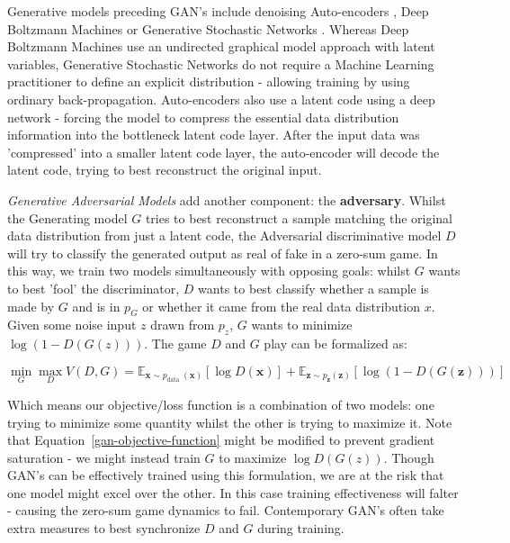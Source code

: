 \documentclass{article}
\begin{document}
Generative models preceding GAN's include denoising Auto-encoders \cite{lu2013speech}, Deep Boltzmann Machines \cite{salakhutdinov2009deep} or Generative Stochastic Networks \cite{bengio2014deep}. Whereas Deep Boltzmann Machines use an undirected graphical model approach with latent variables, Generative Stochastic Networks do not require a Machine Learning practitioner to define an explicit distribution - allowing training by using ordinary back-propagation. Auto-encoders also use a latent code using a deep network - forcing the model to compress the essential data distribution information into the bottleneck latent code layer. After the input data was 'compressed' into a smaller latent code layer, the auto-encoder will decode the latent code, trying to best reconstruct the original input.

\textit{Generative Adversarial Models} \cite{goodfellow2014generative} add another component: the \textbf{adversary}. Whilst the Generating model $G$ tries to best reconstruct a sample matching the original data distribution from just a latent code, the Adversarial discriminative model $D$ will try to classify the generated output as real of fake in a zero-sum game. In this way, we train two models simultaneously with opposing goals: whilst $G$ wants to best 'fool' the discriminator, $D$ wants to best classify whether a sample is made by $G$ and is in $p_G$ or whether it came from the real data distribution $x$. Given some noise input $z$ drawn from $p_z$, $G$ wants to minimize $\log(1-D(G(z)))$. The game $D$ and $G$ play can be formalized as:

\begin{equation}\label{gan-objective-function}
\min _{G} \max _{D} V(D, G) = \mathbb{E}_{\boldsymbol{x} \sim p_{\text {data }}(\boldsymbol{x})}[\log D(\boldsymbol{x})]+\mathbb{E}_{\boldsymbol{z} \sim p_{\boldsymbol{z}}(\boldsymbol{z})}[\log (1-D(G(\boldsymbol{z})))]
\end{equation}

Which means our objective/loss function is a combination of two models: one trying to minimize some quantity whilst the other is trying to maximize it. Note that Equation~\ref{gan-objective-function} might be modified to prevent gradient saturation - we might instead train $G$ to maximize $\log D(G(z))$. Though GAN's can be effectively trained using this formulation, we are at the risk that one model might excel over the other. In this case training effectiveness will falter - causing the zero-sum game dynamics to fail. Contemporary GAN's often take extra measures to best synchronize $D$ and $G$ during training.
\end{document}
